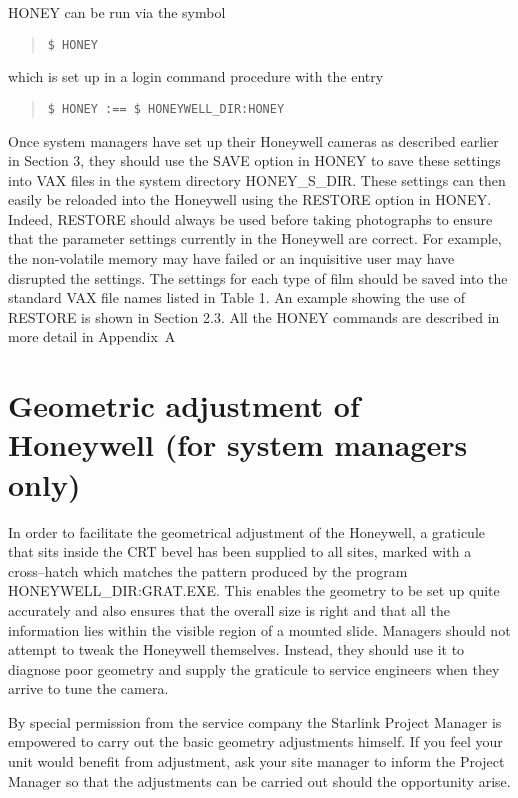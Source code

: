 HONEY can be run via the symbol

\begin{quote}
\begin{verbatim}
$ HONEY
\end{verbatim}
\end{quote}

which is set up in a login command procedure with the entry

\begin{quote}
\begin{verbatim}
$ HONEY :== $ HONEYWELL_DIR:HONEY
\end{verbatim}
\end{quote}

Once system managers have set up their Honeywell cameras as described earlier in
Section 3, they should use the SAVE option in HONEY to save these settings
into VAX files in the system directory HONEY\_S\_DIR. These settings can then
easily be reloaded into the Honeywell using the RESTORE option in HONEY.
Indeed, RESTORE should always be used before taking photographs to ensure that
the parameter settings currently in the Honeywell
are correct. For example, the non-volatile memory
may have failed or an inquisitive user may have disrupted the settings.
The settings for each type of film should be saved into
the standard VAX file names listed in Table 1. An example showing the use
of RESTORE is shown in Section 2.3. All the HONEY commands are described
in more detail in Appendix~A

\section {Geometric adjustment of Honeywell (for system managers only)}

In order to facilitate the geometrical adjustment of the Honeywell, a
graticule that sits inside the CRT bevel has been supplied to all sites, marked
with a cross--hatch which matches the pattern produced by the program
HONEYWELL\_DIR:GRAT.EXE. This enables the geometry to be set up quite accurately and
also ensures that the overall size is right and that all the information
lies within the visible region of a mounted slide. Managers should not attempt
to tweak the Honeywell themselves. Instead, they should use it to diagnose
poor geometry and supply the graticule to service engineers when they arrive to
tune the camera.

By special permission from the service company the Starlink Project Manager
is empowered to carry out the basic geometry adjustments himself. If you feel
your unit would benefit from adjustment, ask your site manager to inform
the Project Manager so that the adjustments can be carried out should the
opportunity arise.

